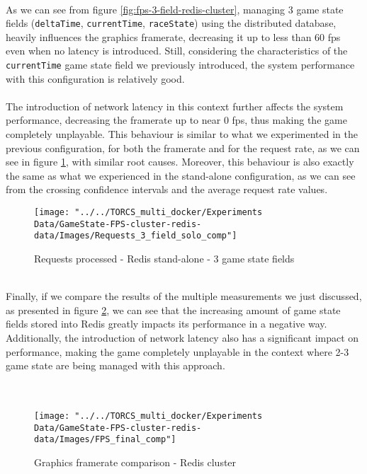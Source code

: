 \\ As we can see from figure \ref{fig:fps-3-field-redis-cluster}, managing 3 game state fields (\texttt{deltaTime}, \texttt{currentTime}, \texttt{raceState}) using the distributed database, heavily influences the graphics framerate, decreasing it up to less than 60 fps even when no latency is introduced. Still, considering the characteristics of the \texttt{currentTime} game state field we previously introduced, the system performance with this configuration is relatively good. \\ \\
The introduction of network latency in this context further affects the system performance, decreasing the framerate up to near 0 fps, thus making the game completely unplayable. This behaviour is similar to what we experimented in the previous configuration, for both the framerate and for the request rate, as we can see in figure \ref{fig:requests-3-field-redis-cluster}, with similar root causes. Moreover, this behaviour is also exactly the same as what we experienced in the stand-alone configuration, as we can see from the crossing confidence intervals and the average request rate values. \\
\begin{figure}[h!]
	\centering
	\texttt{[image: "../../TORCS\_multi\_docker/Experiments Data/GameState-FPS-cluster-redis-data/Images/Requests\_3\_field\_solo\_comp"]}
	\caption[Requests processed - Redis cluster - 3 game state fields]{Requests processed - Redis stand-alone - 3 game state fields}
	\label{fig:requests-3-field-redis-cluster}
\end{figure}
\pagebreak
\\ Finally, if we compare the results of the multiple measurements we just discussed, as presented in figure \ref{fig:fps-comparison-redis-cluster}, we can see that the increasing amount of game state fields stored into Redis greatly impacts its performance in a negative way. \\
Additionally, the introduction of network latency also has a significant impact on performance, making the game completely unplayable in the context where 2-3 game state are being managed with this approach. \\ \\ \\
\begin{figure}[h!]
	\centering
	\texttt{[image: "../../TORCS\_multi\_docker/Experiments Data/GameState-FPS-cluster-redis-data/Images/FPS\_final\_comp"]}
	\caption[Graphics framerate comparison - Redis cluster]{Graphics framerate comparison - Redis cluster}
	\label{fig:fps-comparison-redis-cluster}
\end{figure}
